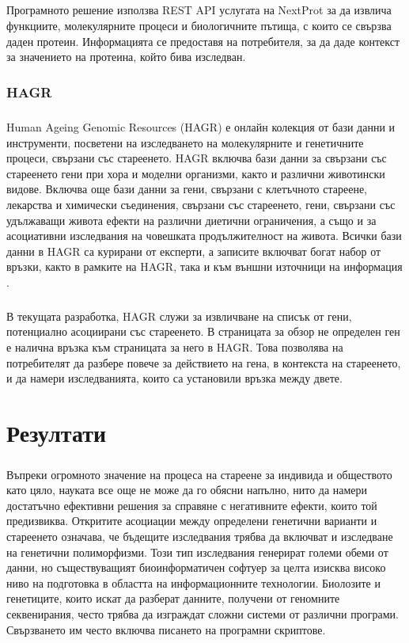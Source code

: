 \documentclass[pdftex,cyrillic,14pt,a4page,twoside,openright]{extreport}
\begin{document}
\paragraph{}
Програмното решение използва REST API услугата на NextProt за да извлича функциите, молекулярните процеси и биологичните пътища, с които се свързва даден протеин. Информацията се предоставя на потребителя, за да даде контекст за значението на протеина, който бива изследван.

\subsection{HAGR}
\paragraph{}
Human Ageing Genomic Resources (HAGR) е онлайн колекция от бази данни и инструменти, посветени на изследването на молекулярните и генетичните процеси, свързани със стареенето. HAGR включва бази данни за свързани със стареенето гени при хора и моделни организми, както и различни животински видове. Включва още бази данни за гени, свързани с клетъчното стареене, лекарства и химически съединения, свързани със стареенето, гени, свързани със удължаващи живота ефекти на различни диетични ограничения, а също и за асоциативни изследвания на човешката продължителност на живота. Всички бази данни в HAGR са курирани от експерти, а записите включват богат набор от връзки, както в рамките на HAGR, така и към външни източници на информация \cite{tacutu2018}.

\paragraph{}
В текущата разработка, HAGR служи за извличване на списък от гени, потенциално асоциирани със стареенето. В страницата за обзор не определен ген е налична връзка към страницата за него в HAGR. Това позволява на потребителят да разбере повече за действието на гена, в контекста на стареенето, и да намери изследванията, които са установили връзка между двете.

\chapter{Резултати}
\paragraph{}
Въпреки огромното значение на процеса на стареене за индивида и обществото като цяло, науката все още не може да го обясни напълно, нито да намери достатъчно ефективни решения за справяне с негативните ефекти, които той предизвиква. Откритите асоциации между определени генетични варианти и стареенето означава, че бъдещите изследвания трябва да включват и изследване на генетични полиморфизми. Този тип изследвания генерират големи обеми от данни, но съществуващият биоинформатичен софтуер за целта изисква високо ниво на подготовка в областта на информационните технологии. Биолозите и генетиците, които искат да разберат данните, получени от геномните секвенирания, често трябва да изграждат сложни системи от различни програми. Свързването им често включва писането на програмни скриптове.
\end{document}

